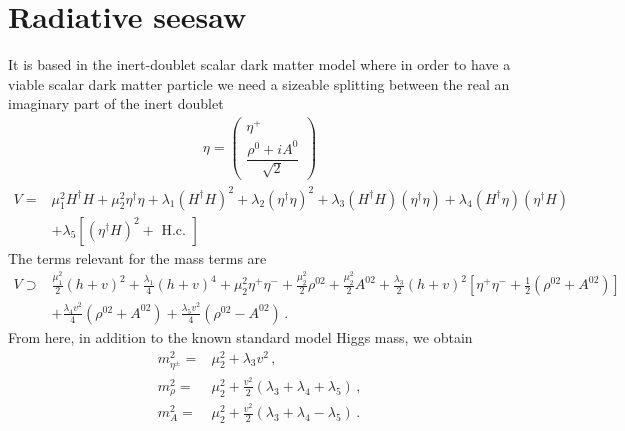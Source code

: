 \section{Radiative seesaw}
It is based in the inert-doublet scalar dark matter model where in order to have a viable scalar dark matter particle we need a sizeable splitting between the real an imaginary part of the inert doublet
\begin{align}
  \eta=\begin{pmatrix}
    \eta^+\\
    \dfrac{\rho^0+i A^0}{\sqrt{2}}
  \end{pmatrix}
\end{align}
\begin{align}
  V=& \mu_{1}^{2} H^{\dagger} H+\mu_{2}^{2} \eta^{\dagger} \eta+\lambda_{1}\left(H^{\dagger} H\right)^{2}+ \lambda_{2}\left(\eta^{\dagger} \eta\right)^{2} +\lambda_{3}\left(H^{\dagger} H\right)\left(\eta^{\dagger} \eta\right)+\lambda_{4}\left(H^{\dagger} \eta\right)\left(\eta^{\dagger} H\right) \nonumber\\
& + \lambda_{5}\left[\left(\eta^{\dagger} H\right)^{2}+\text { H.c. }\right]
\end{align}
The terms relevant for the mass terms are
\begin{align}
  V\supset& \frac{\mu_1^2}{2} \left( h+v\right)^2+\frac{\lambda_1}{4} \left( h+v \right)^4
  +\mu_2^2 \eta^+\eta^- +\frac{\mu_2^2}{2} \rho^{02} +\frac{\mu_2^2}{2} A^{02}
  +\frac{\lambda_3}{2} \left( h+v \right)^2 \left[ \eta^+\eta^- + \frac{1}{2}\left( \rho^{02}+A^{02} \right) \right] \nonumber\\
 &+ \frac{\lambda_4 v^2}{4} \left( \rho^{02}+A^{02} \right) + \frac{\lambda_5 v^2}{4} \left( \rho^{02}-A^{02} \right)\,.
\end{align}
From here, in addition to the known standard model Higgs mass, we obtain
\begin{align}
  m_{\eta^{\pm}}^2=&\mu_2^2+{\lambda_3 v^2}\,,  \nonumber\\ %
  m_{\rho}^2=&\mu_2^2+\frac{v^2}{2} \left(\lambda_3+\lambda_4+\lambda_5  \right)\,, \nonumber\\
  m_{A}^2=&\mu_2^2+\frac{v^2}{2} \left(\lambda_3+\lambda_4-\lambda_5  \right)\,. \nonumber\\
\end{align}

